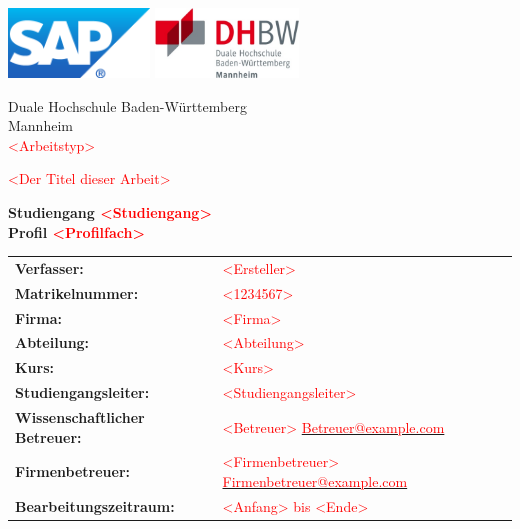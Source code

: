 \documentclass[fontsize=12pt,listof=totoc]{scrreprt}
\makeatletter
\newcommand{\Ersteller}{\textcolor{red}{<Ersteller>}}
\newcommand{\Kurs}{\textcolor{red}{<Kurs>}}
\newcommand{\Studiengang}{\textcolor{red}{<Studiengang>}}
\newcommand{\Profilfach}{\textcolor{red}{<Profilfach>}}
\newcommand{\Titel}{\textcolor{red}{<Der Titel dieser Arbeit>}}
\newcommand{\Arbeitstyp}{\textcolor{red}{<Arbeitstyp>}}
\newcommand{\Matrikelnummer}{\textcolor{red}{<1234567>}}
\newcommand{\Firma}{\textcolor{red}{<Firma>}}
\newcommand{\Abteilung}{\textcolor{red}{<Abteilung>}}
\newcommand{\Studiengangsleiter}{\textcolor{red}{<Studiengangsleiter>}}
\newcommand{\DHBetreuer}{\textcolor{red}{<Betreuer>}}
\newcommand{\DHBetreuerEmail}{\textcolor{red}{Betreuer@example.com}}
\newcommand{\Betreuer}{\textcolor{red}{<Firmenbetreuer>}}
\newcommand{\BetreuerEmail}{\textcolor{red}{Firmenbetreuer@example.com}}
\newcommand{\Zeitraum}{\textcolor{red}{<Anfang> bis <Ende>}}
\newif\ifsperr
\newif\ifroman
\makeatother
\begin{document}
	\ifroman
		\pagenumbering{Roman}
	\fi
	\hypertarget{top}{}
	\bookmark[dest=top]{\Titel}
	\begin{titlepage}
		\includegraphics[height=70px]{img/firma}
		\hfill
		\includegraphics[height=70px]{img/dhbw}
		\begin{center}
			\large{Duale Hochschule Baden-Württemberg\\
			Mannheim}\\
			\Arbeitstyp\\
			\vspace{20px}
			\begin{onehalfspace}
				{\LARGE\sffamily\Titel\\}
			\end{onehalfspace}
			\vspace{30px}
			\normalsize
			\textbf{Studiengang \Studiengang}\\
			\textbf{\small{Profil \Profilfach}}\\
			\ifsperr
				\textcolor{red}{\textbf{-Sperrvermerk-}}\\
			\fi
			\vfill
		\end{center}
		\begin{tabular}{ll}
			\textbf{Verfasser:} & \Ersteller\\
			\textbf{Matrikelnummer:} & \Matrikelnummer\\
			\textbf{Firma:} & \Firma\\
			\textbf{Abteilung:} & \Abteilung\\
			\textbf{Kurs:} & \Kurs\\
			\textbf{Studiengangsleiter:} & \Studiengangsleiter \\
			\textbf{Wissenschaftlicher Betreuer:} & \DHBetreuer{} \flq{}\href{mailto:\plainDHBetreuerEmail}{\DHBetreuerEmail}\frq{}\\
			\textbf{Firmenbetreuer:} & \Betreuer{} \flq{}\href{mailto:\plainBetreuerEmail}{\BetreuerEmail}\frq{}\\
			\textbf{Bearbeitungszeitraum:} & \Zeitraum\\
		\end{tabular}
	\end{titlepage}
	
\end{document}
